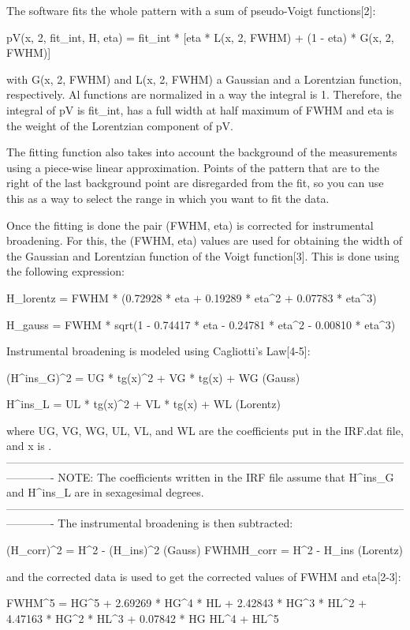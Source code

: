 The software fits the whole pattern with a sum of pseudo-Voigt functions[2]:

    pV(x, 2\theta, fit_int, H, eta) = fit_int * [eta * L(x, 2\theta, FWHM) + (1 - eta) * G(x, 2\theta, FWHM)]

with G(x, 2\theta, FWHM) and L(x, 2\theta, FWHM) a Gaussian and a Lorentzian function, respectively. Al functions are normalized in a way the integral is 1. Therefore, the integral of pV is fit_int, has a full width at half maximum of FWHM and eta is the weight of the Lorentzian component of pV.

The fitting function also takes into account the background of the measurements using a piece-wise linear approximation. Points of the pattern that are to the right of the last background point are disregarded from the fit, so you can use this as a way to select the range in which you want to fit the data.

Once the fitting is done the pair (FWHM, eta) is corrected for instrumental broadening. For this, the (FWHM, eta) values are used for obtaining the width of the Gaussian and Lorentzian function of the Voigt function[3]. This is done using the following expression:

H_{lorentz} = FWHM * (0.72928 * eta + 0.19289 * eta^2 + 0.07783 * eta^3)

H_{gauss} = FWHM * sqrt(1 - 0.74417 * eta - 0.24781 * eta^2 - 0.00810 * eta^3)

Instrumental broadening is modeled using Cagliotti's Law[4-5]:

(H^ins_G)^2 = UG * tg(x)^2 + VG * tg(x) + WG (Gauss)

H^ins_L = UL * tg(x)^2 + VL * tg(x) + WL (Lorentz)

where UG, VG, WG, UL, VL, and WL are the coefficients put in the IRF.dat file, and x is \theta.
-------------------------------------------------------------------------------------------------------------------------
NOTE: The coefficients written in the IRF file assume that H^ins_G and H^ins_L are in sexagesimal degrees.
-------------------------------------------------------------------------------------------------------------------------
The instrumental broadening is then subtracted:

(H_corr)^2 = H^2 - (H_ins)^2 (Gauss)
FWHMH_corr = H^2 - H_ins (Lorentz)

and the corrected data is used to get the corrected values of FWHM and eta[2-3]:

FWHM^5 = HG^5 + 2.69269 * HG^4 * HL + 2.42843 * HG^3 * HL^2 + 4.47163 * HG^2 * HL^3 + 0.07842 * HG HL^4 + HL^5

